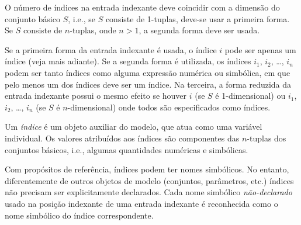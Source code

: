 \documentclass[11pt, brazil]{report}
\begin{document}
\newpage

O número de índices na entrada indexante deve coincidir com a
dimensão do conjunto básico $S$, i.e., se $S$ consiste de 1-tuplas,
deve-se usar a primeira forma. Se $S$ consiste de $n$-tuplas, onde
$n>1$, a segunda forma deve ser usada.


Se a primeira forma da entrada indexante é usada, o índice $i$ pode ser
apenas um índice (veja mais adiante). Se a segunda forma é utilizada, os índices
$i_1$, $i_2$, \dots, $i_n$ podem ser tanto índices como alguma expressão numérica
ou simbólica, em que pelo menos um dos índices deve ser um índice.
Na terceira, a forma reduzida da entrada indexante possui o mesmo efeito
se houver $i$ (se $S$ é 1-dimensional) ou
$i_1$, $i_2$, \dots, $i_n$ (se $S$ é $n$-dimensional) onde todos são especificados
como índices.


Um {\it índice} é um objeto auxiliar do modelo, que atua como uma
variável individual. Os valores atribuídos aos índices são componentes
das $n$-tuplas dos conjuntos básicos, i.e., algumas quantidades
numéricas e simbólicas.


Com propósitos de referência, índices podem ter nomes simbólicos.
No entanto, diferentemente de outros objetos de modelo (conjuntos,
parâmetros, etc.) índices não precisam ser \linebreak explicitamente declarados.
Cada nome simbólico {\it não-declarado} usado na posição indexante de
uma entrada indexante é reconhecida como o nome simbólico do índice
correspondente.
\end{document}
